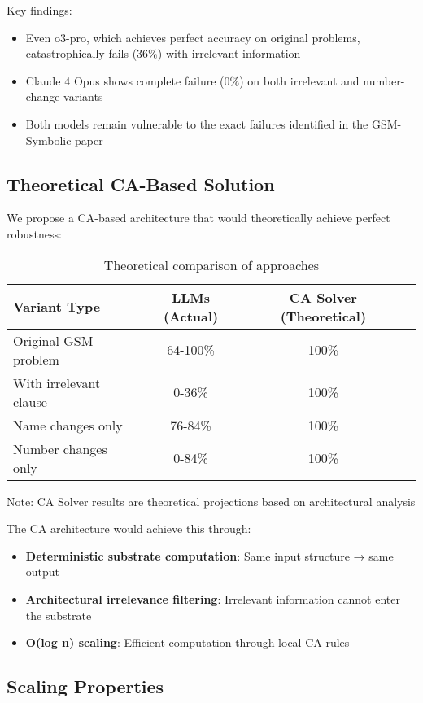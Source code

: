 \documentclass[11pt,letterpaper]{article}
\theoremstyle{plain}
\theoremstyle{definition}
\theoremstyle{remark}
\begin{document}
Key findings:
\begin{itemize}
\item Even o3-pro, which achieves perfect accuracy on original problems, catastrophically fails (36\%) with irrelevant information
\item Claude 4 Opus shows complete failure (0\%) on both irrelevant and number-change variants
\item Both models remain vulnerable to the exact failures identified in the GSM-Symbolic paper
\end{itemize}

\subsection{Theoretical CA-Based Solution}

We propose a CA-based architecture that would theoretically achieve perfect robustness:

\begin{table}[h]
\centering
\caption{Theoretical comparison of approaches}
\begin{tabular}{lccc}
\toprule
\textbf{Variant Type} & \textbf{LLMs (Actual)} & \textbf{CA Solver (Theoretical)} \\
\midrule
Original GSM problem & 64-100\% & 100\% \\
With irrelevant clause & 0-36\% & 100\% \\
Name changes only & 76-84\% & 100\% \\
Number changes only & 0-84\% & 100\% \\
\bottomrule
\end{tabular}
\footnotesize{Note: CA Solver results are theoretical projections based on architectural analysis}
\end{table}

The CA architecture would achieve this through:
\begin{itemize}
\item \textbf{Deterministic substrate computation}: Same input structure → same output
\item \textbf{Architectural irrelevance filtering}: Irrelevant information cannot enter the substrate
\item \textbf{O(log n) scaling}: Efficient computation through local CA rules
\end{itemize}

\subsection{Scaling Properties}
\end{document}
